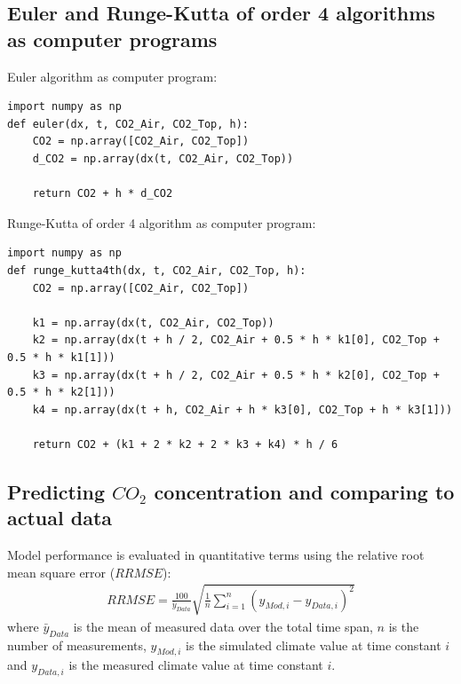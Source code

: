 \documentclass[a4paper]{article}
\newcommand*\mean[1]{\bar{#1}}
\begin{document}
\subsection{Euler and Runge-Kutta of order 4 algorithms as computer programs}
Euler algorithm as computer program:
\begin{mdframed}[leftline=false,rightline=false,backgroundcolor=magenta!10]
  \begin{verbatim}
import numpy as np
def euler(dx, t, CO2_Air, CO2_Top, h):
    CO2 = np.array([CO2_Air, CO2_Top])
    d_CO2 = np.array(dx(t, CO2_Air, CO2_Top))

    return CO2 + h * d_CO2
  \end{verbatim}
\end{mdframed}

Runge-Kutta of order 4 algorithm as computer program:
\begin{mdframed}[leftline=false,rightline=false,backgroundcolor=magenta!10]
  \begin{verbatim}
import numpy as np
def runge_kutta4th(dx, t, CO2_Air, CO2_Top, h):
    CO2 = np.array([CO2_Air, CO2_Top])

    k1 = np.array(dx(t, CO2_Air, CO2_Top))
    k2 = np.array(dx(t + h / 2, CO2_Air + 0.5 * h * k1[0], CO2_Top + 0.5 * h * k1[1]))
    k3 = np.array(dx(t + h / 2, CO2_Air + 0.5 * h * k2[0], CO2_Top + 0.5 * h * k2[1]))
    k4 = np.array(dx(t + h, CO2_Air + h * k3[0], CO2_Top + h * k3[1]))

    return CO2 + (k1 + 2 * k2 + 2 * k3 + k4) * h / 6
  \end{verbatim}
\end{mdframed}

\subsection{Predicting \(CO_2\) concentration and comparing to actual data}

Model performance is evaluated in quantitative terms using the relative root mean square error (\(RRMSE\))\cite{kobayashi2000comparing}:
\begin{align}
  \label{eq:rrmse}
  RRMSE = \frac{100}{\mean{y}_{Data}} \sqrt{\frac{1}{n} \sum_{i=1}^{n} {\left(y_{Mod,i} - y_{Data,i}\right)}^2}
\end{align}
where \(\mean{y}_{Data}\) is the mean of measured data over the total time span, \(n\) is the number of measurements, \(y_{Mod,i}\) is the simulated climate value at time constant \(i\) and \(y_{Data,i}\) is the measured climate value at time constant \(i\).
\end{document}
